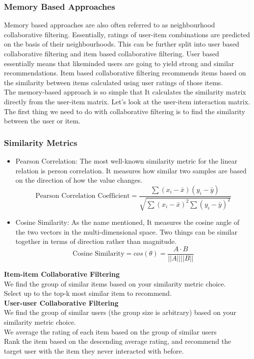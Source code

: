 \subsubsection{Memory Based Approaches}
Memory based approaches are also often referred to as neighbourhood collaborative filtering. Essentially, ratings of user-item combinations are predicted on the basis of their neighbourhoods. This can be further split into user based collaborative filtering and item based collaborative filtering. User based essentially means that likeminded users are going to yield strong and similar recommendations. Item based collaborative filtering recommends items based on the similarity between items calculated using user ratings of those items.
\\The memory-based approach is so simple that It calculates the similarity matrix directly from the user-item matrix. Let's look at the user-item interaction matrix. The first thing we need to do with collaborative filtering is to find the similarity between the user or item.

\subsubsection*{Similarity Metrics}
\begin{itemize}
\item Pearson Correlation: The most well-known similarity metric for the linear relation is person correlation. It measures how similar two samples are based on the direction of how the value changes.
\begin{equation*}
\text{Pearson Correlation Coefficient} = \frac{\sum(x_{i} - \bar{x})(y_{i} - \bar{y})} {\sqrt{\sum(x_{i} - \bar{x})^{2} \sum{(y_{i} - \bar{y})^{2} }}}
\end{equation*}
\item Cosine Similarity:  As the name mentioned, It measures the cosine angle of the two vectors in the multi-dimensional space. Two things can be similar together in terms of direction rather than magnitude.
\begin{equation*}
\text{Cosine Similarity} = cos(\theta) = \frac{A \cdot B}{||A|| ||B||}
\end{equation*}
\end{itemize}
\textbf{Item-item Collaborative Filtering}
\\We find the group of similar items based on your similarity metric choice.
\\Select up to the top-k most similar item to recommend.
\\\textbf{User-user Collaborative Filtering}
\\We find the group of similar users (the group size is arbitrary) based on your similarity metric choice.
\\We average the rating of each item based on the group of similar users
\\Rank the item based on the descending average rating, and recommend the target user with the item they never interacted with before.



